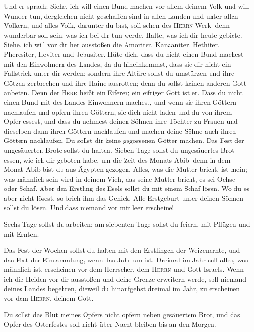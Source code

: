  Und er sprach: Siehe, ich will einen Bund machen vor
allem deinem Volk und will Wunder tun, dergleichen nicht geschaffen sind
in allen Landen und unter allen Völkern, und alles Volk, darunter du
bist, soll sehen des \textsc{Herrn} Werk; denn wunderbar soll sein, was
ich bei dir tun werde.  Halte, was ich dir heute gebiete.
Siehe, ich will vor dir her ausstoßen die Amoriter, Kanaaniter,
Hethiter, Pheresiter, Heviter und Jebusiter.  Hüte dich,
dass du nicht einen Bund machest mit den Einwohnern des Landes, da du
hineinkommst, dass sie dir nicht ein Fallstrick unter dir werden;
 sondern ihre Altäre sollst du umstürzen und ihre Götzen
zerbrechen und ihre Haine ausrotten;  denn du sollst
keinen anderen Gott anbeten. Denn der \textsc{Herr} heißt ein Eiferer;
ein eifriger Gott ist er.  Dass du nicht einen Bund mit
des Landes Einwohnern machest, und wenn sie ihren Göttern nachlaufen und
opfern ihren Göttern, sie dich nicht laden und du von ihrem Opfer
essest,  und dass du nehmest deinen Söhnen ihre Töchter
zu Frauen und dieselben dann ihren Göttern nachlaufen und machen deine
Söhne auch ihren Göttern nachlaufen.  Du sollst dir keine
gegossenen Götter machen.  Das Fest der ungesäuerten
Brote sollst du halten. Sieben Tage sollst du ungesäuertes Brot essen,
wie ich dir geboten habe, um die Zeit des Monats Abib; denn in dem Monat
Abib bist du aus Ägypten gezogen.  Alles, was die Mutter
bricht, ist mein; was männlich sein wird in deinem Vieh, das seine
Mutter bricht, es sei Ochse oder Schaf.  Aber den
Erstling des Esels sollst du mit einem Schaf lösen. Wo du es aber nicht
lösest, so brich ihm das Genick. Alle Erstgeburt unter deinen Söhnen
sollst du lösen. Und dass niemand vor mir leer erscheine!

 Sechs Tage sollst du arbeiten; am siebenten Tage sollst
du feiern, mit Pflügen und mit Ernten.

 Das Fest der Wochen sollst du halten mit den Erstlingen
der Weizenernte, und das Fest der Einsammlung, wenn das Jahr um ist.
 Dreimal im Jahr soll alles, was männlich ist, erscheinen
vor dem Herrscher, dem \textsc{Herrn} und Gott Israels. 
Wenn ich die Heiden vor dir ausstoßen und deine Grenze erweitern werde,
soll niemand deines Landes begehren, dieweil du hinaufgehst dreimal im
Jahr, zu erscheinen vor dem \textsc{Herrn}, deinem Gott.

 Du sollst das Blut meines Opfers nicht opfern neben
gesäuertem Brot, und das Opfer des Osterfestes soll nicht über Nacht
bleiben bis an den Morgen.

